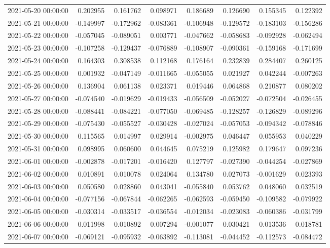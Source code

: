 \begin{tabular}{lrrrrrrr}
2021-05-20 00:00:00 & 0.202955 & 0.161762 & 0.098971 & 0.186689 & 0.126690 & 0.155345 & 0.122392 \\
2021-05-21 00:00:00 & -0.149997 & -0.172962 & -0.083361 & -0.106948 & -0.129572 & -0.183103 & -0.156286 \\
2021-05-22 00:00:00 & -0.057045 & -0.089051 & 0.003771 & -0.047662 & -0.058683 & -0.092928 & -0.062494 \\
2021-05-23 00:00:00 & -0.107258 & -0.129437 & -0.076889 & -0.108907 & -0.090361 & -0.159168 & -0.171699 \\
2021-05-24 00:00:00 & 0.164303 & 0.308538 & 0.112168 & 0.176164 & 0.232839 & 0.284407 & 0.260125 \\
2021-05-25 00:00:00 & 0.001932 & -0.047149 & -0.011665 & -0.055055 & 0.021927 & 0.042244 & -0.007263 \\
2021-05-26 00:00:00 & 0.136904 & 0.061138 & 0.023371 & 0.019446 & 0.064868 & 0.210877 & 0.080202 \\
2021-05-27 00:00:00 & -0.074540 & -0.019629 & -0.019433 & -0.056509 & -0.052027 & -0.072504 & -0.026455 \\
2021-05-28 00:00:00 & -0.088441 & -0.084221 & -0.077050 & -0.069485 & -0.128257 & -0.126829 & -0.089296 \\
2021-05-29 00:00:00 & -0.075430 & -0.055527 & -0.030428 & -0.027024 & -0.057053 & -0.094342 & -0.078846 \\
2021-05-30 00:00:00 & 0.115565 & 0.014997 & 0.029914 & -0.002975 & 0.046447 & 0.055953 & 0.040229 \\
2021-05-31 00:00:00 & 0.098995 & 0.060600 & 0.044645 & 0.075219 & 0.125982 & 0.179647 & 0.097236 \\
2021-06-01 00:00:00 & -0.002878 & -0.017201 & -0.016420 & 0.127797 & -0.027390 & -0.044254 & -0.027869 \\
2021-06-02 00:00:00 & 0.010891 & 0.010078 & 0.024064 & 0.134780 & 0.027073 & -0.001629 & 0.023393 \\
2021-06-03 00:00:00 & 0.050580 & 0.028860 & 0.043041 & -0.055840 & 0.053762 & 0.048060 & 0.032519 \\
2021-06-04 00:00:00 & -0.077156 & -0.067844 & -0.062265 & -0.062593 & -0.059450 & -0.109582 & -0.079922 \\
2021-06-05 00:00:00 & -0.030314 & -0.033517 & -0.036554 & -0.012034 & -0.023083 & -0.060386 & -0.031799 \\
2021-06-06 00:00:00 & 0.011998 & 0.010892 & 0.007294 & -0.001077 & 0.030421 & 0.013536 & 0.018781 \\
2021-06-07 00:00:00 & -0.069121 & -0.095932 & -0.063892 & -0.113081 & -0.044452 & -0.112573 & -0.084472 \\

\end{tabular}
